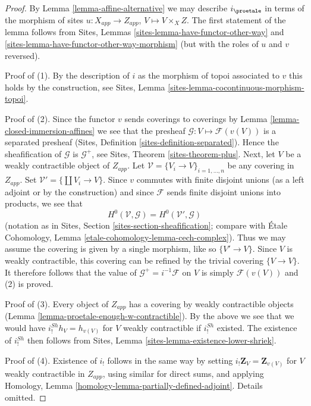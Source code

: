 \begin{proof}
By Lemma \ref{lemma-affine-alternative} we may describe $i_\proetale$ in terms
of the morphism of sites $u : X_{app} \to Z_{app}$, $V \mapsto V \times_X Z$.
The first statement of the lemma follows from
Sites, Lemmas \ref{sites-lemma-have-functor-other-way} and
\ref{sites-lemma-have-functor-other-way-morphism}
(but with the roles of $u$ and $v$ reversed).

\medskip\noindent
Proof of (1). By the description of $i$ as the morphism of topoi associated
to $v$ this holds by the construction, see
Sites, Lemma \ref{sites-lemma-cocontinuous-morphism-topoi}.

\medskip\noindent
Proof of (2). Since the functor $v$ sends coverings to coverings by
Lemma \ref{lemma-closed-immersion-affines} we see that the presheaf
$\mathcal{G} : V \mapsto \mathcal{F}(v(V))$ is a separated presheaf
(Sites, Definition \ref{sites-definition-separated}). Hence
the sheafification of $\mathcal{G}$ is $\mathcal{G}^+$, see
Sites, Theorem \ref{sites-theorem-plus}. Next, let $V$ be a weakly
contractible object of $Z_{app}$. Let
$\mathcal{V} = \{V_i \to V\}_{i = 1, \ldots, n}$
be any covering in $Z_{app}$. Set $\mathcal{V}' = \{\coprod V_i \to V\}$.
Since $v$ commutes with finite disjoint unions (as a left adjoint or by
the construction) and since $\mathcal{F}$ sends finite disjoint
unions into products, we see that
$$
H^0(\mathcal{V}, \mathcal{G}) = H^0(\mathcal{V}', \mathcal{G})
$$
(notation as in Sites, Section \ref{sites-section-sheafification};
compare with
\'Etale Cohomology, Lemma \ref{etale-cohomology-lemma-cech-complex}).
Thus we may assume the covering is given by a single morphism, like
so $\{V' \to V\}$. Since $V$ is weakly contractible, this covering
can be refined by the trivial covering $\{V \to V\}$.
It therefore follows that the value of $\mathcal{G}^+ = i^{-1}\mathcal{F}$
on $V$ is simply $\mathcal{F}(v(V))$ and (2) is proved.

\medskip\noindent
Proof of (3). Every object of $Z_{app}$ has a covering by weakly
contractible objects (Lemma \ref{lemma-proetale-enough-w-contractible}).
By the above we see that we would have $i^{Sh}_!h_V = h_{v(V)}$ for $V$
weakly contractible if $i^{Sh}_!$ existed. The existence of
$i^{Sh}_!$ then follows from
Sites, Lemma \ref{sites-lemma-existence-lower-shriek}.

\medskip\noindent
Proof of (4). Existence of $i_!$ follows in the same way by setting
$i_!\mathbf{Z}_V = \mathbf{Z}_{v(V)}$ for $V$ weakly contractible in $Z_{app}$,
using similar for direct sums, and applying
Homology, Lemma \ref{homology-lemma-partially-defined-adjoint}.
Details omitted.


\end{proof}
